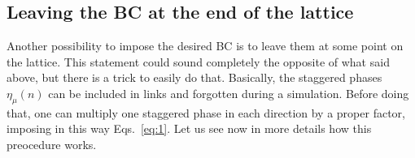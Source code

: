 \documentclass[a4paper,10pt]{article}
\newcommand{\Eqs}[1]{Eqs.~\eqref{eq:#1}}
\begin{document}


\subsection{Leaving the BC at the end of the lattice}\label{Str2}

Another possibility to impose the desired BC is to leave them at some point on the lattice.
This statement could sound completely the opposite of what said above, but there is a trick
to easily do that. Basically, the staggered phases $\eta_\mu(n)$ can be included in links
and forgotten during a simulation. Before doing that, one can multiply one staggered phase in
each direction by a proper factor, imposing in this way \Eqs{1}. Let us see now in more
details how this preocedure works.
\end{document}
